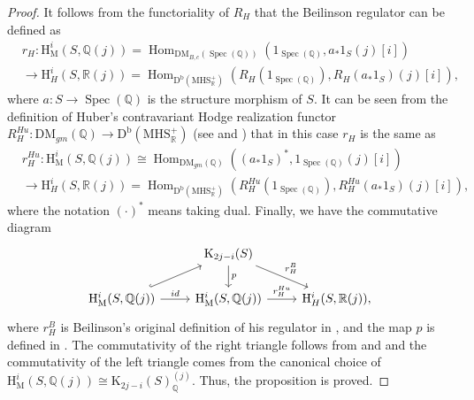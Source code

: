 \documentclass[11pt, a4paper]{amsart}
\theoremstyle{plain}
\theoremstyle{definition}
\numberwithin{equation}{section}
\def\QQ{\mathbb{Q}}
\def\RR{\mathbb{R}}
\DeclareMathOperator{\Hom}{Hom}
\DeclareMathOperator{\Spec}{Spec}
\begin{document}
 \begin{proof}
     It follows from the functoriality of $R_{H}$ that the Beilinson regulator can be defined as 
     \begin{align*}
         & r_{H} \colon \mathrm{H}_{\mathrm{M}}^{i}(S,\QQ(j)) = \Hom_{\mathrm{DM}_{B, c}(\Spec (\QQ))}(1_{\Spec (\QQ)}, a_{*} 1_{S} (j)[i]) \\ 
         & \rightarrow \mathrm{H}^{i}_{H}(S, \RR(j)) = \Hom_{\mathrm{D}^{\mathrm{b}}(\mathrm{MHS}^{+}_{\RR})}(R_{H}(1_{\Spec (\QQ)}), R_H(a_{*} 1_{S})(j)[i]),
     \end{align*}
     where $a \colon S \rightarrow \Spec (\QQ)$ is the structure morphism of $S$. It can be seen from the definition of Huber's contravariant Hodge realization functor $R_{H}^{Hu} \colon \mathrm{DM}_{gm}(\QQ) \rightarrow \mathrm{D}^{\mathrm{b}}(\mathrm{MHS}^{+}_{\RR
     })$ (see \cite[Theorem 2.3.3]{Huber00} and \cite[Theorem B.2.2]{Huber04}) that in this case $r_{H}$ is the same as 
     \begin{align*}
         & r_{H}^{Hu} \colon \mathrm{H}_{\mathrm{M}}^{i}(S,\QQ(j)) \cong \Hom_{\mathrm{DM}_{gm}(\QQ)}((a_{*} 1_{S})^{*}, 1_{\Spec (\QQ)} (j)[i]) \\ 
         & \rightarrow \mathrm{H}^{i}_{H}(S, \RR(j)) = \Hom_{\mathrm{D}^{\mathrm{b}}(\mathrm{MHS}^{+}_{\RR})}(R_{H}^{Hu}(1_{\Spec (\QQ)}), R_H^{Hu}(a_{*} 1_{S})(j)[i]),
     \end{align*}
     where the notation $(\cdot)^{*}$ means taking dual. 
     Finally, we have the commutative diagram 
     \[
        \begin{tikzcd}
            & \mathrm{K}_{2j - i}(S) \ar[d, "p"] \ar[rd,"r_{H}^{B}"] &  \\
          \mathrm{H}_{\mathrm{M}}^{i}(S,\QQ(j))  \ar[ru, hook] \ar[r, "id"] & \mathrm{H}_{\mathrm{M}}^{i}(S,\QQ(j)) \ar[r, "r_{H}^{Hu}"] &  \mathrm{H}^{i}_{H}(S, \RR(j)), 
        \end{tikzcd}
     \]
     where $r_{H}^{B}$ is Beilinson's original definition of his regulator in \textnormal{\cite[\S 2]{Beilinson_conjecture_original}}, and the map $p$ is defined in \cite[Corollary 4.2.2]{Huber00}. The commutativity of the right triangle follows from \cite[Definition 18.2.6, Proposition 18.2.8]{Huberbook} and \cite[Corollary 4.2.3]{Huber04} and the commutativity of the left triangle comes from the canonical choice of $\mathrm{H}_{\mathrm{M}}^{i}(S, \QQ(j)) \cong \mathrm{K}_{2j-i}(S)_{\QQ}^{(j)}$. Thus, the proposition is proved.
 \end{proof}
\end{document}
